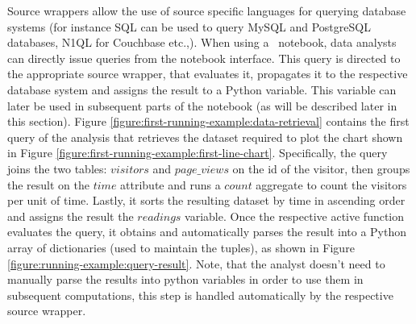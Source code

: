 
Source wrappers allow the use of source specific languages for querying database systems (for instance SQL can be used to query MySQL and PostgreSQL databases, N1QL for Couchbase etc.,). When using a \projname\ notebook, data analysts can directly issue queries from the notebook interface. This query is directed to the appropriate source wrapper, that evaluates it, propagates it to the respective database system and assigns the result to a Python variable. This variable can later be used in subsequent parts of the notebook (as will be described later in this section). Figure \ref{figure:first-running-example:data-retrieval} contains the first query of the analysis that retrieves the dataset required to plot the chart shown in Figure \ref{figure:first-running-example:first-line-chart}. Specifically, the query joins the two tables: $visitors$ and $page\_views$ on the id of the visitor, then groups the result on the $time$ attribute and runs a $count$ aggregate to count the visitors per unit of time. Lastly, it sorts the resulting dataset by time in ascending order and assigns the result the $readings$ variable. Once the respective active function evaluates the query, it obtains and automatically parses the result into a Python array of dictionaries (used to maintain the tuples), as shown in Figure \ref{figure:running-example:query-result}. Note, that the analyst doesn't need to manually parse the results into python variables in order to use them in subsequent computations, this step is handled automatically by the respective source wrapper. 

